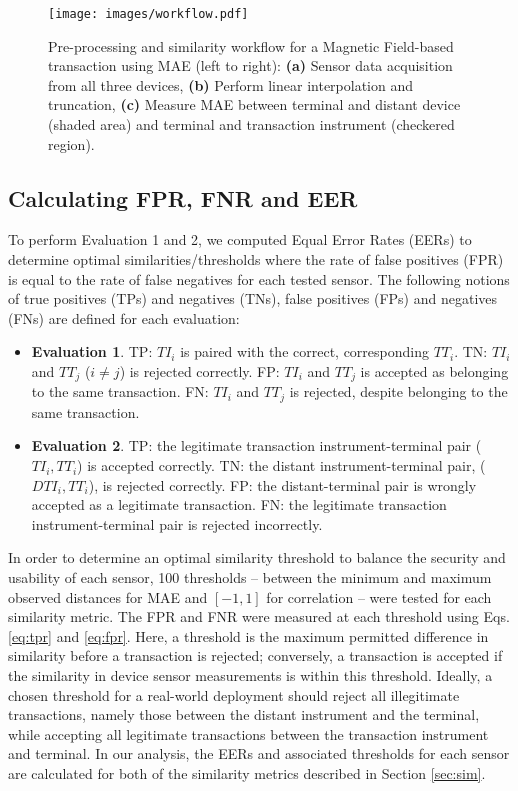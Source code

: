 \documentclass[runningheads,a4paper]{llncs}
\begin{document}
\begin{figure*}
	\centering
	\texttt{[image: images/workflow.pdf]}
	\caption{Pre-processing and similarity workflow for a Magnetic Field-based transaction using MAE (left to right): \textbf{(a)} Sensor data acquisition from all three devices, \textbf{(b)} Perform linear interpolation and truncation, \textbf{(c)} Measure MAE between terminal and distant device (shaded area) and terminal and transaction instrument (checkered region).}    \label{fig:workflow}
\end{figure*}

\subsection{Calculating FPR, FNR and EER}
\label{sec:CalculatingFPRFNRandEER}

To perform Evaluation 1 and 2, we computed Equal Error Rates (EERs) to determine optimal similarities/thresholds where the rate of false positives (FPR) is equal to the rate of false negatives for each tested sensor.  The following notions of true positives (TPs) and negatives (TNs), false positives (FPs) and negatives (FNs) are defined for each evaluation:
\begin{itemize}
	\item \textbf{Evaluation 1}. TP: $TI_{i}$ is paired with the correct, corresponding $TT_{i}$.  TN: $TI_{i}$ and $TT_{j}$ ($i \neq j$) is rejected correctly.  FP: $TI_{i}$ and $TT_{j}$ is accepted as belonging to the same transaction.  FN: $TI_{i}$ and $TT_{j}$ is rejected, despite belonging to the same transaction.\\

	\item \textbf{Evaluation 2}.  TP: the legitimate transaction instrument-terminal pair ($TI_{i}, TT_{i}$) is accepted correctly.  TN: the distant instrument-terminal pair, ($DTI_{i}, TT_{i}$), is rejected correctly.  FP: the distant-terminal pair is wrongly accepted as a legitimate transaction.  FN: the legitimate transaction instrument-terminal pair is rejected incorrectly.
\end{itemize}

In order to determine an optimal similarity threshold to balance the security and usability of each sensor, 100 thresholds -- between the minimum and maximum observed distances for MAE and $[-1,1]$ for correlation -- were tested for each similarity metric.  The FPR and FNR were measured at each threshold using Eqs. \ref{eq:tpr} and \ref{eq:fpr}.  Here, a threshold is the maximum permitted difference in similarity before a transaction is rejected; conversely, a transaction is accepted if the similarity in device sensor measurements is within this threshold.  Ideally, a chosen threshold for a real-world deployment should reject all illegitimate transactions, namely those between the distant instrument and the terminal, while accepting all legitimate transactions between the transaction instrument and terminal.   In our analysis, the EERs and associated thresholds for each sensor are calculated for both of the similarity metrics described in Section \ref{sec:sim}.
\end{document}
